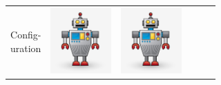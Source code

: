 \documentclass{standalone}
\newcommand{\picHeight}{1in}
\begin{document}
        \begin{tabular}{| c | c | c | c | c | c |}
            \hline
            \pbox{20cm}{Config-\\uration} &
            \includegraphics[height=\picHeight]{robot-character.jpg} &
            \includegraphics[height=\picHeight]{robot-character.jpg} &

\end{tabular}
\end{document}
